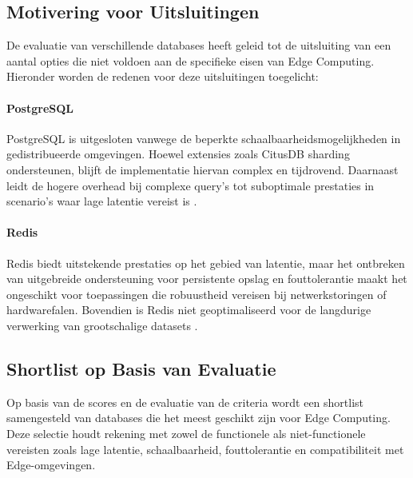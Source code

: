 
    \subsection{Motivering voor Uitsluitingen}

    De evaluatie van verschillende databases heeft geleid tot de uitsluiting van een aantal opties die niet voldoen aan de specifieke eisen van Edge Computing. Hieronder worden de redenen voor deze uitsluitingen toegelicht:

    \paragraph{PostgreSQL}
    PostgreSQL is uitgesloten vanwege de beperkte schaalbaarheidsmogelijkheden in gedistribueerde omgevingen. Hoewel extensies zoals CitusDB sharding ondersteunen, blijft de implementatie hiervan complex en tijdrovend. Daarnaast leidt de hogere overhead bij complexe query’s tot suboptimale prestaties in scenario’s waar lage latentie vereist is \autocite{PostgreSQLDocumentation, Kleppmann2017}.

    \paragraph{Redis}
    Redis biedt uitstekende prestaties op het gebied van latentie, maar het ontbreken van uitgebreide ondersteuning voor persistente opslag en fouttolerantie maakt het ongeschikt voor toepassingen die robuustheid vereisen bij netwerkstoringen of hardwarefalen. Bovendien is Redis niet geoptimaliseerd voor de langdurige verwerking van grootschalige datasets \autocite{RedisDocumentation, Mahmud2020}.

    \subsection{Shortlist op Basis van Evaluatie}
    Op basis van de scores en de evaluatie van de criteria wordt een shortlist samengesteld van databases die het meest geschikt zijn voor Edge Computing. Deze selectie houdt rekening met zowel de functionele als niet-functionele vereisten zoals lage latentie, schaalbaarheid, fouttolerantie en compatibiliteit met Edge-omgevingen.


